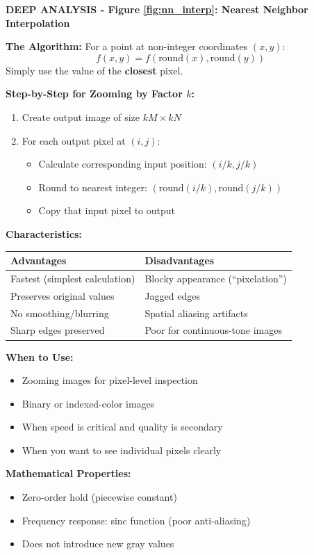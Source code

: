 \documentclass[12pt,a4paper]{article}
\begin{document}
\begin{deepexplanation}
\textbf{DEEP ANALYSIS - Figure \ref{fig:nn_interp}: Nearest Neighbor Interpolation}

\textbf{The Algorithm:}
For a point at non-integer coordinates $(x, y)$:
\[
f(x, y) = f(\text{round}(x), \text{round}(y))
\]
Simply use the value of the \textbf{closest} pixel.

\textbf{Step-by-Step for Zooming by Factor $k$:}
\begin{enumerate}
    \item Create output image of size $kM \times kN$
    \item For each output pixel at $(i, j)$:
    \begin{itemize}
        \item Calculate corresponding input position: $(i/k, j/k)$
        \item Round to nearest integer: $(\text{round}(i/k), \text{round}(j/k))$
        \item Copy that input pixel to output
    \end{itemize}
\end{enumerate}

\textbf{Characteristics:}
\begin{center}
\begin{tabular}{|l|l|}
\hline
\textbf{Advantages} & \textbf{Disadvantages} \\
\hline
Fastest (simplest calculation) & Blocky appearance (``pixelation'') \\
Preserves original values & Jagged edges \\
No smoothing/blurring & Spatial aliasing artifacts \\
Sharp edges preserved & Poor for continuous-tone images \\
\hline
\end{tabular}
\end{center}

\textbf{When to Use:}
\begin{itemize}
    \item Zooming images for pixel-level inspection
    \item Binary or indexed-color images
    \item When speed is critical and quality is secondary
    \item When you want to see individual pixels clearly
\end{itemize}

\textbf{Mathematical Properties:}
\begin{itemize}
    \item Zero-order hold (piecewise constant)
    \item Frequency response: sinc function (poor anti-aliasing)
    \item Does not introduce new gray values
\end{itemize}
\end{deepexplanation}
\end{document}
